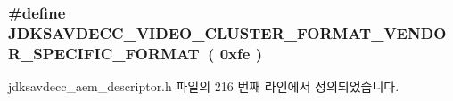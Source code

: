 \subsubsection[{\texorpdfstring{J\+D\+K\+S\+A\+V\+D\+E\+C\+C\+\_\+\+V\+I\+D\+E\+O\+\_\+\+C\+L\+U\+S\+T\+E\+R\+\_\+\+F\+O\+R\+M\+A\+T\+\_\+\+V\+E\+N\+D\+O\+R\+\_\+\+S\+P\+E\+C\+I\+F\+I\+C\+\_\+\+F\+O\+R\+M\+AT}{JDKSAVDECC_VIDEO_CLUSTER_FORMAT_VENDOR_SPECIFIC_FORMAT}}]{\setlength{\rightskip}{0pt plus 5cm}\#define J\+D\+K\+S\+A\+V\+D\+E\+C\+C\+\_\+\+V\+I\+D\+E\+O\+\_\+\+C\+L\+U\+S\+T\+E\+R\+\_\+\+F\+O\+R\+M\+A\+T\+\_\+\+V\+E\+N\+D\+O\+R\+\_\+\+S\+P\+E\+C\+I\+F\+I\+C\+\_\+\+F\+O\+R\+M\+AT~( 0xfe )}\hypertarget{group__video__cluster__format_ga6aace470d42d79d69a85674fa2498c7e}{}\label{group__video__cluster__format_ga6aace470d42d79d69a85674fa2498c7e}


jdksavdecc\+\_\+aem\+\_\+descriptor.\+h 파일의 216 번째 라인에서 정의되었습니다.

